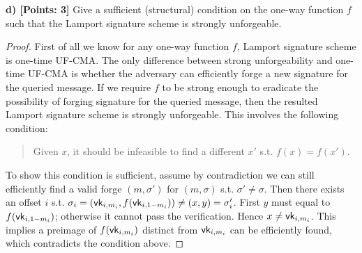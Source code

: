 \documentclass[12pt]{article}
\theoremstyle{definition}
\begin{document}
{\bf d) [Points: 3]} Give a sufficient (structural) condition on the one-way function $f$ such that
the Lamport signature scheme is strongly unforgeable.
\begin{proof}
First of all we know for any one-way function $f$, Lamport signature scheme is one-time UF-CMA. The only difference between strong unforgeability and one-time UF-CMA is whether the adversary can efficiently forge a new signature for the queried message. If we require $f$ to be strong enough to eradicate the possibility of forging signature for the queried message, then the resulted Lamport signature scheme is strongly unforgeable. This involves the following condition:
\begin{quote}
\item Given $x$, it should be infeasible to find a different $x'$ s.t. $f(x)=f(x')$.
\end{quote}
To show this condition is sufficient, assume by contradiction we can still efficiently find a valid forge $(m,\sigma')$ for $(m,\sigma)$ s.t. $\sigma' \not= \sigma$. Then there exists an offset $i$ s.t. $\sigma_i = (\mathsf{vk}_{i,m_i}, f(\mathsf{vk}_{i,1-m_i})) \not= (x, y) = \sigma'_i$. First $y$ must equal to $f(\mathsf{vk}_{i,1-m_i})$; otherwise it cannot pass the verification. Hence $x\not= \mathsf{vk}_{i,m_i}$. This implies a preimage of $f(\mathsf{vk}_{i,m_i})$ distinct from $\mathsf{vk}_{i,m_i}$ can be efficiently found, which contradicts the condition above.
\end{proof}
\end{document}

